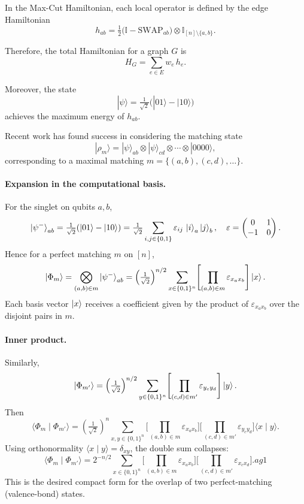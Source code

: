 \documentclass[11pt]{article}
\newcommand{\ip}[2]{\langle #1 \mid #2 \rangle}
\begin{document}
In the Max-Cut Hamiltonian, each local operator is defined by the edge Hamiltonian
\[
	h_{ab} = \tfrac{1}{2}\bigl(\mathbb{I} - \mathrm{SWAP}_{ab}\bigr)\otimes \mathbb{I}_{[n]\setminus\{a,b\}}.
\]

Therefore, the total Hamiltonian for a graph $G$ is
\[
	H_G = \sum_{e\in E} w_e\, h_e.
\]

Moreover, the state
\[
	|\psi\rangle = \tfrac{1}{\sqrt{2}}\bigl(|01\rangle - |10\rangle\bigr)
\]
achieves the maximum energy of $h_{ab}$.

Recent work has found success in considering the matching state
\[
	|\rho_m\rangle = |\psi\rangle_{ab} \otimes |\psi\rangle_{cd} \otimes \cdots \otimes |0000\rangle,
\]
corresponding to a maximal matching $m = \{(a,b), (c,d), \ldots\}$.

\paragraph{Expansion in the computational basis.}
For the singlet on qubits $a,b$,
\[
\ket{\psi^-}_{ab}
=\tfrac{1}{\sqrt{2}}(\ket{01}-\ket{10})
=\tfrac{1}{\sqrt{2}}\sum_{i,j\in\{0,1\}}\varepsilon_{ij}\,\ket{i}_a\ket{j}_b,
\quad
\varepsilon=\begin{pmatrix}0&1\\-1&0\end{pmatrix}.
\]
Hence for a perfect matching $m$ on $[n]$,
\[
\ket{\Phi_m}
=\bigotimes_{(a,b)\in m}\ket{\psi^-}_{ab}
=\left(\tfrac{1}{\sqrt{2}}\right)^{n/2}
\sum_{x\in\{0,1\}^n}
\Biggl[\prod_{(a,b)\in m}\varepsilon_{x_a x_b}\Biggr]\ket{x}.
\]
Each basis vector $\ket{x}$ receives a coefficient given by the product of
$\varepsilon_{x_a x_b}$ over the disjoint pairs in $m$.

\paragraph{Inner product.}
Similarly,
\[
\ket{\Phi_{m'}}
=\left(\tfrac{1}{\sqrt{2}}\right)^{n/2}
\sum_{y\in\{0,1\}^n}
\Biggl[\prod_{(c,d)\in m'}\varepsilon_{y_c y_d}\Biggr]\ket{y}.
\]
Then
\[
\ip{\Phi_m}{\Phi_{m'}}
=\left(\tfrac{1}{\sqrt{2}}\right)^{n}
\sum_{x,y\in\{0,1\}^n}
\Biggl[\prod_{(a,b)\in m}\varepsilon_{x_a x_b}\Biggr]
\Biggl[\prod_{(c,d)\in m'}\varepsilon_{y_c y_d}\Biggr]
\ip{x}{y}.
\]
Using orthonormality $\ip{x}{y}=\delta_{xy}$, the double sum collapses:
\[
\ip{\Phi_m}{\Phi_{m'}}
=2^{-n/2}
\sum_{x\in\{0,1\}^n}
\Biggl[\prod_{(a,b)\in m}\varepsilon_{x_a x_b}\Biggr]
\Biggl[\prod_{(c,d)\in m'}\varepsilon_{x_c x_d}\Biggr].
	ag{1}\label{eq:overlap-compact}
\]
This is the desired compact form for the overlap of two perfect-matching (valence-bond) states.
\end{document}
